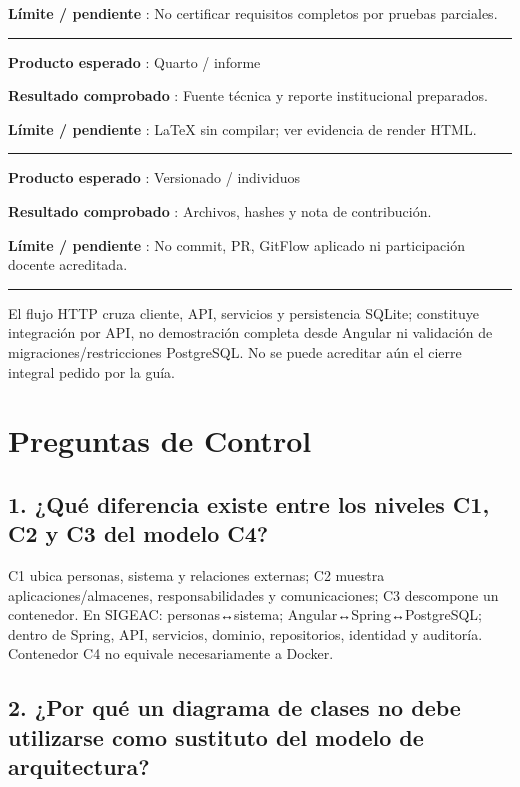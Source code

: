 \documentclass[11pt,a4paper]{article}
\begin{document}
\textbf{Límite / pendiente }: No certificar requisitos completos por
pruebas parciales.

\medskip\hrule\medskip

\textbf{Producto esperado }: Quarto / informe

\textbf{Resultado comprobado }: Fuente técnica y reporte institucional
preparados.

\textbf{Límite / pendiente }: LaTeX sin compilar; ver evidencia de
render HTML.

\medskip\hrule\medskip

\textbf{Producto esperado }: Versionado / individuos

\textbf{Resultado comprobado }: Archivos, hashes y nota de contribución.

\textbf{Límite / pendiente }: No commit, PR, GitFlow aplicado ni
participación docente acreditada.

\medskip\hrule\medskip

El flujo HTTP cruza cliente, API, servicios y persistencia SQLite;
constituye integración por API, no demostración completa desde Angular
ni validación de migraciones/restricciones PostgreSQL. No se puede
acreditar aún el cierre integral pedido por la guía.

\section{Preguntas de Control}\label{informe-preguntas-de-control}

\subsection{1. ¿Qué diferencia existe entre los niveles C1, C2 y C3 del
modelo
C4?}\label{informe-1-quuxe9-diferencia-existe-entre-los-niveles-c1-c2-y-c3-del-modelo-c4}

C1 ubica personas, sistema y relaciones externas; C2 muestra
aplicaciones/almacenes, responsabilidades y comunicaciones; C3
descompone un contenedor. En SIGEAC: personas↔sistema;
Angular↔Spring↔PostgreSQL; dentro de Spring, API, servicios, dominio,
repositorios, identidad y auditoría. Contenedor C4 no equivale
necesariamente a Docker.

\subsection{2. ¿Por qué un diagrama de clases no debe utilizarse como
sustituto del modelo de
arquitectura?}\label{informe-2-por-quuxe9-un-diagrama-de-clases-no-debe-utilizarse-como-sustituto-del-modelo-de-arquitectura}
\end{document}
